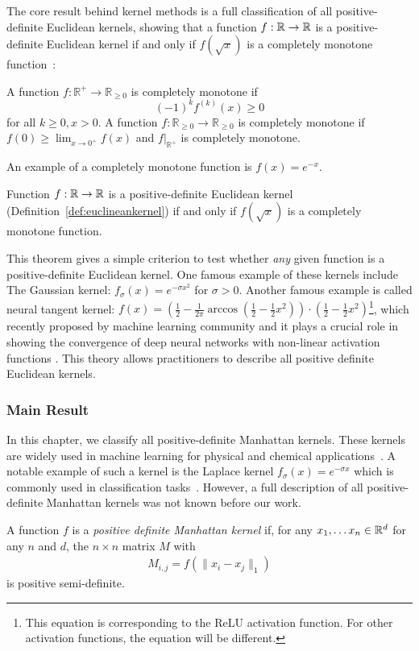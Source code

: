 The core result behind kernel methods is a full classification of all positive-definite Euclidean kernels, showing that a function $f : {\mathbb R} \to {\mathbb R}$ is a positive-definite Euclidean kernel if and only if $f(\sqrt{x})$ is a completely monotone function~\cite{s42, sow01}:  

\begin{definition}\label{def:cm}
A function $f:\mathbb R^+\to\mathbb R_{\geq 0}$ is completely monotone if 
  \[(-1)^k f^{(k)}(x) \geq 0\] 
  for all $k \geq 0, x > 0$. A function $f: \mathbb R_{\geq 0}\to \mathbb R_{\geq 0}$ is completely monotone if $f(0)\geq \lim_{x \to 0^{+}} f(x)$ and $f|_{\mathbb R^+}$ is completely monotone.
\end{definition}
An example of a completely monotone function is $f(x) = e^{-x}$. 
\begin{theorem}\label{fact:kernel-euc}
Function $f: {\mathbb R} \to {\mathbb R}$ is a positive-definite Euclidean kernel (Definition~\ref{def:euclineankernel}) if and only if $f(\sqrt{x})$ is a completely monotone function.
\end{theorem}
This theorem gives a simple criterion to test whether \emph{any} given function is a positive-definite Euclidean kernel. One famous example of these kernels include The Gaussian kernel: $f_{\sigma}(x) = e^{-\sigma x^2}$ for $\sigma > 0$. Another famous example is called neural tangent kernel: $f(x) = ( \frac{1}{2}- \frac{1 }{2\pi} \arccos ( \frac{1}{2} - \frac{1}{2} x^2 ) ) \cdot (\frac{1}{2} - \frac{1}{2}x^2)$\footnote{This equation is corresponding to the ReLU activation function. For other activation functions, the equation will be different.}, which recently proposed by machine learning community \cite{jgh18} and it plays a crucial role in showing the convergence of deep neural networks with non-linear activation functions \cite{ll18,dzps19,als19_dnn,als19_rnn,sy19,lsswy20,bpsw21}. This theory allows practitioners to describe all positive definite Euclidean kernels.

\subsubsection{Main Result}

In this chapter, we classify all positive-definite Manhattan kernels. These kernels are widely used in machine learning for physical and chemical  applications~\cite{flla15, l18, lrrk15}. A notable example of such a kernel is the Laplace kernel $f_\sigma (x) = e^{-\sigma x}$ which is commonly used in classification tasks~\cite{bmm18}. However, a full description of all positive-definite Manhattan kernels  was not known before our work.
 \begin{definition}\label{def:manhattan_kernel} 
 A function $f$ is a \emph{positive definite Manhattan kernel} if, for any $x_1, \ldots x_n \in {\mathbb R}^d$ for any $n$ and $d$, the $n \times n$ matrix $M$ with
 \begin{align*}
  M_{i,j} = f(\|x_i - x_j\|_1) 
 \end{align*}
 is positive semi-definite. 
 \end{definition}
 
